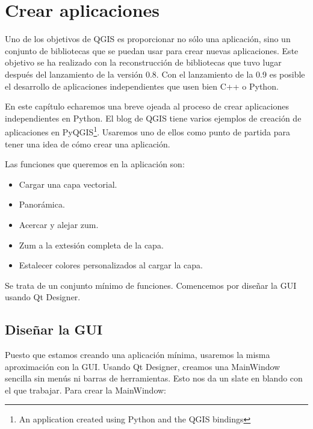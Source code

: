 \section{Crear aplicaciones}

Uno de los objetivos de QGIS es proporcionar no sólo una aplicación, sino un conjunto de
bibliotecas que se puedan usar para crear nuevas aplicaciones. Este objetivo se ha realizado
con la reconstrucción de bibliotecas que tuvo lugar después del lanzamiento de la versión 0.8.
Con el lanzamiento de la 0.9 es posible el desarrollo de aplicaciones independientes que usen
bien C++ o Python.

En este capítulo echaremos una breve ojeada al proceso de crear aplicaciones independientes en
Python. El blog de QGIS tiene varios ejemplos de creación de aplicaciones en
PyQGIS\footnote{An application created using Python and the QGIS bindings}. Usaremos uno de
ellos como punto de partida para tener una idea de cómo crear una aplicación.

Las funciones que queremos en la aplicación son:

\begin{itemize}
\item Cargar una capa vectorial.
\item Panorámica.
\item Acercar y alejar zum.
\item Zum a la extesión completa de la capa.
\item Estalecer colores personalizados al cargar la capa.
\end{itemize} 

Se trata de un conjunto mínimo de funciones. Comencemos por diseñar la GUI usando Qt Designer.

\subsection{Diseñar la GUI}

Puesto que estamos creando una aplicación mínima, usaremos la misma aproximación con la GUI. 
Usando Qt Designer, creamos una MainWindow sencilla sin menús ni barras de herramientas. 
Esto nos da un slate en blando con el que trabajar. Para crear la MainWindow:

